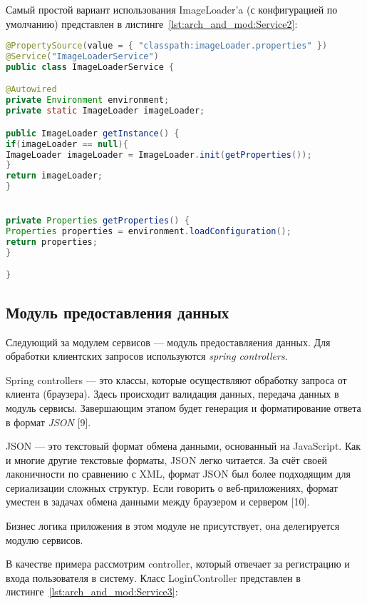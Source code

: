 Самый простой вариант использования ImageLoader'a (с конфигурацией по умолчанию) представлен  в листинге~\ref{lst:arch_and_mod:Service2}:

\begin{lstlisting}[language=Java, style=rubystyle, caption={Определение ImageLoaderService}, label=lst:arch_and_mod:Service2]
@PropertySource(value = { "classpath:imageLoader.properties" })
@Service("ImageLoaderService")
public class ImageLoaderService {

@Autowired
private Environment environment;
private static ImageLoader imageLoader;

public ImageLoader getInstance() {
if(imageLoader == null){
ImageLoader imageLoader = ImageLoader.init(getProperties());
}
return imageLoader;
}


private Properties getProperties() {
Properties properties = environment.loadConfiguration();
return properties;
}

}
\end{lstlisting}


\subsection{Модуль предоставления данных}
\label{sub:arch_and_mod:parser}
Следующий за модулем сервисов --- модуль предоставляения данных. Для обработки клиентских запросов используются \textit{spring controllers}.
 
Spring controllers --- это классы, которые осуществляют обработку запроса от клиента (браузера). Здесь происходит валидация данных, передача данных в модуль сервисы. Завершающим этапом будет генерация и форматирование ответа в формат \textit{JSON} [9].

JSON --- это текстовый формат обмена данными, основанный на JavaScript. Как и многие другие текстовые форматы, JSON легко читается. За счёт своей лаконичности по сравнению с XML, формат JSON был более подходящим для сериализации сложных структур. Если говорить о веб-приложениях, формат уместен в задачах обмена данными между браузером и сервером [10].

Бизнес логика приложения в этом модуле не присутствует, она делегируется модулю сервисов.

В качестве примера рассмотрим controller, который отвечает за регистрацию и входа пользователя в систему. Класс LoginController представлен в листинге~\ref{lst:arch_and_mod:Service3}:

